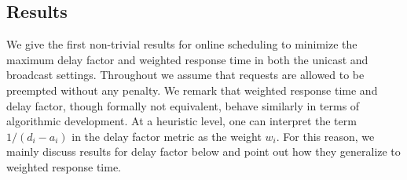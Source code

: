 \subsection{Results}
We give the first non-trivial results for online scheduling to minimize the
maximum delay factor and weighted response time in both the unicast
and broadcast settings. Throughout we assume that requests are
allowed to be preempted without any penalty.  We remark that
weighted response time and delay factor, though formally not
equivalent, behave similarly in terms of algorithmic development. At
a heuristic level, one can interpret the term ${1}/{(d_i-a_i)}$ in
the delay factor metric as the weight $w_i$. For this reason, we
mainly discuss results for delay factor below and point out how they
generalize to weighted response time.
